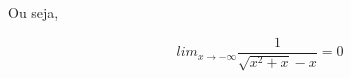 \documentclass{article}
\begin{document}
Ou seja,

\[
    lim_{x\to -\infty} \frac{1}{\sqrt{x^2+x}-x} = 0
\]












\end{document}

